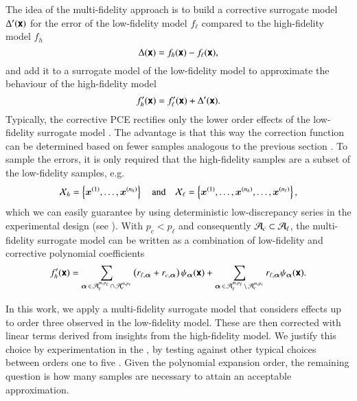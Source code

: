
The idea of the multi-fidelity approach is to build a corrective surrogate model $\Delta'(\boldsymbol{\mathsf{x}})$ for the
error of the low-fidelity model $f_\ell$ compared to the high-fidelity model $f_h$
\begin{equation}
    \Delta(\boldsymbol{\mathsf{x}}) = f_h(\boldsymbol{\mathsf{x}}) - f_\ell(\boldsymbol{\mathsf{x}}),
\end{equation}
and add it to a surrogate model of the low-fidelity model to approximate the behaviour of the
high-fidelity model
\begin{equation}
    f_h'(\boldsymbol{\mathsf{x}}) = f_\ell'(\boldsymbol{\mathsf{x}}) + \Delta'(\boldsymbol{\mathsf{x}}).
\end{equation}
Typically, the corrective PCE rectifies only the lower order effects
of the low-fidelity surrogate model \cite{palar_multi-fidelity_2016}.
The advantage is that this way the correction function can be determined
based on fewer samples analogous to the previous section .
To sample the errors, it is only required that the
high-fidelity samples are a subset of the low-fidelity samples, e.g.
\begin{equation}
    \mathcal{X}_h = \left\{ \bm{x}^{(1)}, \dots, \bm{x}^{(n_h)}\right\} \quad\text{and}\quad
    \mathcal{X}_\ell = \left\{ \bm{x}^{(1)}, \dots, \bm{x}^{(n_h)}, \dots, \bm{x}^{(n_\ell)}\right\},
\end{equation}
which we can easily guarantee by using deterministic low-discrepancy series
in the experimental design (see ).
With $p_c < p_\ell$ and consequently $\mathcal{A}_c \subset \mathcal{A}_\ell$,
the multi-fidelity surrogate model can be written as a combination of low-fidelity
and corrective polynomial coefficients
\begin{equation}
    f_h' (\boldsymbol{\mathsf{x}}) = \sum_{{\bm{\alpha}}\,\in\,\mathcal{A}_\ell^{m,p_\ell} \,\cap\, \mathcal{A}_c^{m,p_c}}
    \left(
     r_{\ell,{\bm{\alpha}}} + r_{c,{\bm{\alpha}}}
    \right) \psi_{\bm{\alpha}}(\boldsymbol{\mathsf{x}}) +
    \sum_{{\bm{\alpha}}\,\in\,\mathcal{A}_\ell^{m,p_\ell} \,\setminus\, \mathcal{A}_c^{m,p_c}}
    r_{\ell,{\bm{\alpha}}} \psi_{\bm{\alpha}}(\boldsymbol{\mathsf{x}}).
\end{equation}


In this work, we apply a multi-fidelity surrogate model that considers
effects up to order three observed in the low-fidelity model. These are then corrected with linear terms derived from insights from the high-fidelity model.
We justify this choice by experimentation in the ,
by testing against other typical choices between orders one to five \cite{gratiet_metamodel-based_2015}.
Given the polynomial expansion order, the remaining question is how many samples are necessary to attain an acceptable approximation.

